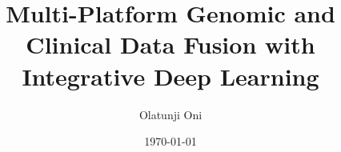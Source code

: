 \documentclass[12pt]{report}
\title{Multi-Platform Genomic and Clinical Data Fusion with Integrative Deep Learning}
\author{Olatunji Oni}
\date{\today}
\begin{document}
\maketitle


\mainmatter{}
    
    
\backmatter{}
    \printbibliography
\end{document}
